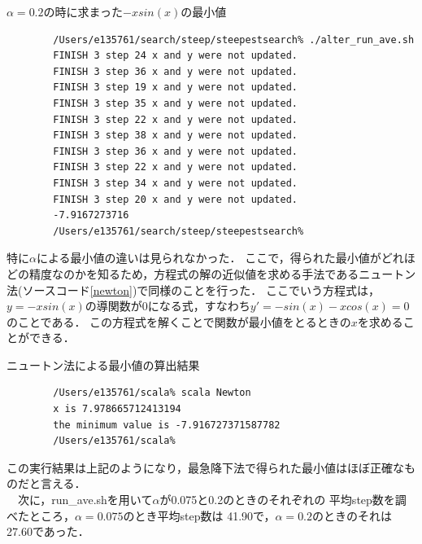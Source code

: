\begin{itembox}[c]{$\alpha=0.2$の時に求まった$-xsin(x)$の最小値}
    {\small
        \begin{verbatim}
        /Users/e135761/search/steep/steepestsearch% ./alter_run_ave.sh
        FINISH 3 step 24 x and y were not updated.
        FINISH 3 step 36 x and y were not updated.
        FINISH 3 step 19 x and y were not updated.
        FINISH 3 step 35 x and y were not updated.
        FINISH 3 step 22 x and y were not updated.
        FINISH 3 step 38 x and y were not updated.
        FINISH 3 step 36 x and y were not updated.
        FINISH 3 step 22 x and y were not updated.
        FINISH 3 step 34 x and y were not updated.
        FINISH 3 step 20 x and y were not updated.
        -7.9167273716
        /Users/e135761/search/steep/steepestsearch%
        \end{verbatim}
    }
\end{itembox}
特に$\alpha$による最小値の違いは見られなかった．
ここで，得られた最小値がどれほどの精度なのかを知るため，方程式の解の近似値を求める手法であるニュートン法\cite{newton}(ソースコード\ref{newton})で同様のことを行った．
ここでいう方程式は，$y=-xsin(x)$の導関数が0になる式，すなわち$y'=-sin(x) - xcos(x)=0$のことである．
この方程式を解くことで関数が最小値をとるときの$x$を求めることができる．



\begin{itembox}[c]{ニュートン法による最小値の算出結果}
    {\small
        \begin{verbatim}
        /Users/e135761/scala% scala Newton
        x is 7.978665712413194
        the minimum value is -7.916727371587782
        /Users/e135761/scala%
        \end{verbatim}
    }
\end{itembox}

この実行結果は上記のようになり，最急降下法で得られた最小値はほぼ正確なものだと言える． \\
　次に，run\_ave.shを用いて$\alpha$が0.075と0.2のときのそれぞれの
平均step数を調べたところ，$\alpha=0.075$のとき平均step数は
41.90で，$\alpha=0.2$のときのそれは27.60であった．


